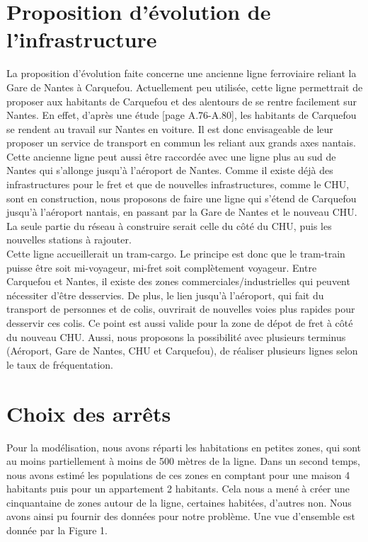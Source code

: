 \documentclass[a4paper,10pt]{article}
\begin{document}
\section{Proposition d'évolution de l'infrastructure}
La proposition d'évolution faite concerne une ancienne ligne ferroviaire reliant la Gare de Nantes à Carquefou. Actuellement peu utilisée, cette ligne permettrait de proposer aux habitants de Carquefou et des alentours de se rentre facilement sur Nantes. En effet, d'après une étude \cite{rapport}[page A.76-A.80], les habitants de Carquefou se rendent au travail sur Nantes en voiture. Il est donc envisageable de leur proposer un service de transport en commun les reliant aux grands axes nantais.
Cette ancienne ligne peut aussi être raccordée avec une ligne plus au sud de Nantes qui s'allonge jusqu'à l'aéroport de Nantes. Comme il existe déjà des infrastructures pour le fret et que de nouvelles infrastructures, comme le CHU, sont en construction, nous proposons de faire une ligne qui s'étend de Carquefou jusqu'à l'aéroport nantais, en passant par la Gare de Nantes et le nouveau CHU. La seule partie du réseau à construire serait celle du côté du CHU, puis les nouvelles stations à rajouter. \\
Cette ligne accueillerait un tram-cargo. Le principe est donc que le tram-train puisse être soit mi-voyageur, mi-fret soit complètement voyageur. Entre Carquefou et Nantes, il existe des zones commerciales/industrielles qui peuvent nécessiter d'être desservies. De plus, le lien jusqu'à l'aéroport, qui fait du transport de personnes et de colis, ouvrirait de nouvelles voies plus rapides pour desservir ces colis. Ce point est aussi valide pour la zone de dépot de fret à côté du nouveau CHU. Aussi, nous proposons la possibilité avec plusieurs terminus (Aéroport, Gare de Nantes, CHU et Carquefou), de réaliser plusieurs lignes selon le taux de fréquentation. 


\section{Choix des arrêts}
Pour la modélisation, nous avons réparti les habitations en petites zones, qui sont au moins partiellement à moins de 500 mètres de la ligne. Dans un second temps, nous avons estimé les populations de ces zones en comptant pour une maison 4 habitants puis pour un appartement 2 habitants. Cela nous a mené à créer une cinquantaine de zones autour de la ligne, certaines habitées, d'autres non. Nous avons ainsi pu fournir des données pour notre problème. Une vue d'ensemble est donnée par la Figure 1.
\end{document}
